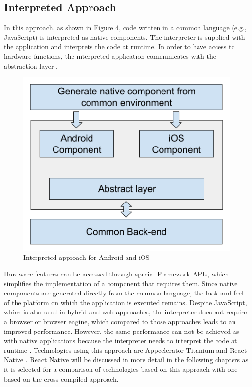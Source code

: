 \documentclass[Bachelor,BIF,english]{twbook}
\begin{document}
\subsection{Interpreted Approach}
In this approach, as shown in Figure 4, code written in a common language (e.g., JavaScript) is interpreted as native components. The interpreter is supplied with the application and interprets the code at runtime. In order to have access to hardware functions, the interpreted application communicates with the abstraction layer \cite[p.~3]{7479278} \cite[p.~2]{7934674}.
\begin{figure}[!htbp]
\centering
\includegraphics[width=0.5\linewidth]{PICs/Interpreted.png}
\caption{Interpreted approach for Android and iOS \cite[p.~3]{7479278}}\label{Fig3}
\end{figure}
Hardware features can be accessed through special Framework APIs, which simplifies the implementation of a component that requires them. Since native components are generated directly from the common language, the look and feel of the platform on which the application is executed remains. Despite JavaScript, which is also used in hybrid and web approaches, the interpreter does not require a browser or browser engine, which compared to those approaches leads to an improved performance. However, the same performance can not be achieved as with native applications because the interpreter needs to interpret the code at runtime \cite[p.~627]{6420693} \cite[p.~3]{7479278}. Technologies using this approach are Appcelerator Titanium and React Native \cite[p.~2]{7934674} \cite[p.~3]{JohanssonSderberg2018}. React Native will be discussed in more detail in the following chapters as it is selected for a comparison of technologies based on this approach with one based on the cross-compiled approach.
\end{document}
